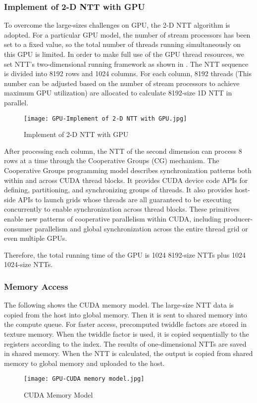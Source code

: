 \subsubsection{Implement of 2-D NTT with GPU}
To overcome the large-sizes challenges on GPU, the 2-D NTT algorithm is adopted. For a particular GPU model, the number of stream processors has been set to a fixed value, so the total number of threads running simultaneously on this GPU is limited. In order to make full use of the GPU thread resources, we set NTT's two-dimensional running framework as shown in . The NTT sequence is divided into 8192 rows and 1024 columns. For each column, 8192 threads (This number can be adjusted based on the number of stream processors to achieve maximum GPU utilization) are allocated to calculate 8192-size 1D NTT in parallel.
\begin{figure}[!ht]
    \centering
    \texttt{[image: GPU-Implement of 2-D NTT with GPU.jpg]}
    \caption{Implement of 2-D NTT with GPU}
    \label{fig:Implement of 2-D NTT with GPU}
\end{figure}
After processing each column, the NTT of the second dimension can process 8 rows at a time through the Cooperative Groups (CG) mechanism. The Cooperative Groups programming model describes synchronization patterns both within and across CUDA thread blocks. It provides CUDA device code APIs for defining, partitioning, and synchronizing groups of threads. It also provides host-side APIs to launch grids whose threads are all guaranteed to be executing concurrently to enable synchronization across thread blocks. These primitives enable new patterns of cooperative parallelism within CUDA, including producer-consumer parallelism and global synchronization across the entire thread grid or even multiple GPUs.

Therefore, the total running time of the GPU is 1024 8192-size NTTs plus 1024 1024-size NTTs.
\subsubsection{Memory Access}
The following  shows the CUDA memory model. The large-size NTT data is copied from the host into global memory. Then it is sent to shared memory into the compute queue. For faster access, precomputed twiddle factors are stored in texture memory. When the twiddle factor is used, it is copied sequentially to the registers according to the index. The results of one-dimensional NTTs are saved in shared memory. When the NTT is calculated, the output is copied from shared memory to global memory and uploaded to the host.
\begin{figure}[!ht]
    \centering
    \texttt{[image: GPU-CUDA memory model.jpg]}
    \caption{CUDA Memory Model}
    \label{fig:CUDA Memory Model}
\end{figure}
